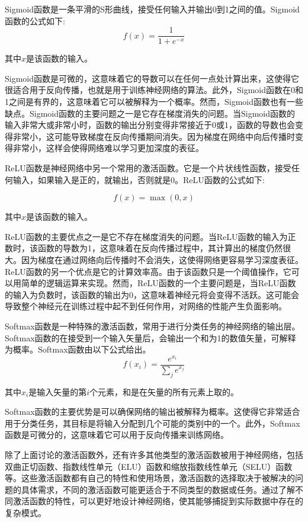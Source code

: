 Sigmoid函数是一条平滑的S形曲线，接受任何输入并输出0到1之间的值。Sigmoid函数的公式如下:
\begin{equation}
\label{eq:2_15}
f(x) = \frac{1} {1 + e^{-x}}
\end{equation}


其中$x$是该函数的输入。

Sigmoid函数是可微的，这意味着它的导数可以在任何一点处计算出来，这使得它很适合用于反向传播，也就是用于训练神经网络的算法。此外，Sigmoid函数在0和1之间是有界的，这意味着它可以被解释为一个概率。然而，Sigmoid函数也有一些缺点。Sigmoid函数的主要问题之一是它存在梯度消失的问题。当Sigmoid函数的输入非常大或非常小时，函数的输出分别变得非常接近于0或1，函数的导数也会变得非常小，这可能导致梯度在反向传播期间消失。因为梯度在网络中向后传播时变得非常小，这样会使得网络难以学习更加深度的表征。


ReLU函数是神经网络中另一个常用的激活函数。它是一个片状线性函数，接受任何输入，如果输入是正的，就输出，否则就是0。ReLU函数的公式如下:

\begin{equation}
\label{eq:2_16}
f(x) = \max(0, x)
\end{equation}


其中$x$是该函数的输入。

ReLU函数的主要优点之一是它不存在梯度消失的问题。当ReLU函数的输入为正数时，该函数的导数为1，这意味着在反向传播过程中，其计算出的梯度仍然很大。因为梯度在通过网络向后传播时不会消失，这使得网络更容易学习深度表征。ReLU函数的另一个优点是它的计算效率高。由于该函数只是一个阈值操作，它可以用简单的逻辑运算来实现。然而，ReLU函数的一个主要问题是，当ReLU函数的输入为负数时，该函数的输出为0，这意味着神经元将会变得不活跃。这可能会导致整个神经元在训练过程中起不到任何作用，对网络的性能产生负面影响。


Softmax函数是一种特殊的激活函数，常用于进行分类任务的神经网络的输出层。Softmax函数的在接受到一个输入矢量后，会输出一个和为1的数值矢量，可解释为概率。Softmax函数由以下公式给出。
\begin{equation}
\label{eq:2_17}
f(x_i) = \frac{e^{x_i}} {\sum_{j}{e^{x_j}}}
\end{equation}

其中$x_i$是输入矢量的第$i$个元素，和是在矢量的所有元素上取的。

Softmax函数的主要优势是可以确保网络的输出被解释为概率。这使得它非常适合用于分类任务，其目标是将输入分配到几个可能的类别中的一个。此外，Softmax函数是可微分的，这意味着它可以用于反向传播来训练网络。

除了上面讨论的激活函数外，还有许多其他类型的激活函数被用于神经网络，包括双曲正切函数、指数线性单元（ELU）函数和缩放指数线性单元（SELU）函数等。这些激活函数都有自己的特性和使用场景，激活函数的选择取决于被解决的问题的具体需求，不同的激活函数可能更适合于不同类型的数据或任务。通过了解不同激活函数的特性，可以更好地设计神经网络，使其能够捕捉到实际数据中存在的复杂模式。


